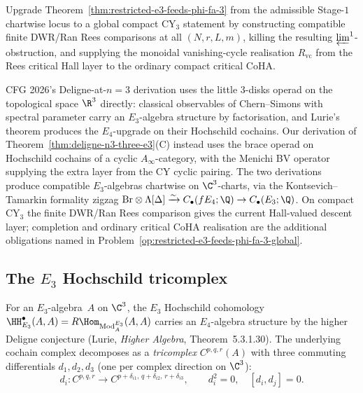 \begin{problem}
\label{op:restricted-e3-feeds-phi-fa-3-global}
Upgrade Theorem~\ref{thm:restricted-e3-feeds-phi-fa-3} from the
admissible Stage-$1$ chartwise locus to a global compact CY$_3$ statement by
constructing compatible finite DWR/Ran Rees comparisons at all
\((N,r,L,m)\), killing the resulting \(\varprojlim^1\)-obstruction, and
supplying the monoidal vanishing-cycle realisation
\(R_{\mathrm{vc}}\) from the Rees critical Hall layer to the ordinary
compact critical CoHA.
\end{problem}

\begin{remark}
\label{rem:cfg2026-chain-level-bridge}
CFG 2026's Deligne-at-$n=3$ derivation uses the little $3$-disks operad on the topological space $\R^3$ directly: classical observables of Chern--Simons with spectral parameter carry an $E_3$-algebra structure by factorisation, and Lurie's theorem produces the $E_4$-upgrade on their Hochschild cochains. Our derivation of Theorem~\ref{thm:deligne-n3-three-e3}(C) instead uses the brace operad on Hochschild cochains of a cyclic $A_\infty$-category, with the Menichi BV operator supplying the extra layer from the CY cyclic pairing. The two derivations produce compatible $E_3$-algebras chartwise on $\C^3$-charts, via the Kontsevich--Tamarkin formality zigzag $\Br \otimes \Lambda[\Delta] \xrightarrow{\sim} C_\bullet(fE_4;\Q) \to C_\bullet(E_3;\Q)$.  On compact CY$_3$ the finite DWR/Ran Rees comparison gives the current Hall-valued descent layer; completion and ordinary critical CoHA realisation are the additional obligations named in Problem~\ref{op:restricted-e3-feeds-phi-fa-3-global}.
\end{remark}

\subsection{The \texorpdfstring{$E_3$}{E-3} Hochschild tricomplex}
\label{subsec:e3-tricomplex}
\label{subsec:e3-bar-class-m}

For an $E_3$-algebra~$A$ on $\C^3$, the $E_3$ Hochschild cohomology $\HH^\bullet_{E_3}(A, A) = R\Hom_{\mathrm{Mod}_A^{E_3}}(A, A)$ carries an $E_4$-algebra structure by the higher Deligne conjecture (Lurie, \emph{Higher Algebra}, Theorem~5.3.1.30). The underlying cochain complex decomposes as a \emph{tricomplex} $C^{p,q,r}(A)$ with three commuting differentials $d_1, d_2, d_3$ (one per complex direction on $\C^3$):
\begin{equation}\label{eq:e3-tricomplex}
 d_i \colon C^{p,q,r} \to C^{p + \delta_{i1},\, q + \delta_{i2},\, r + \delta_{i3}},
 \qquad d_i^2 = 0,\quad [d_i, d_j] = 0.
\end{equation}

